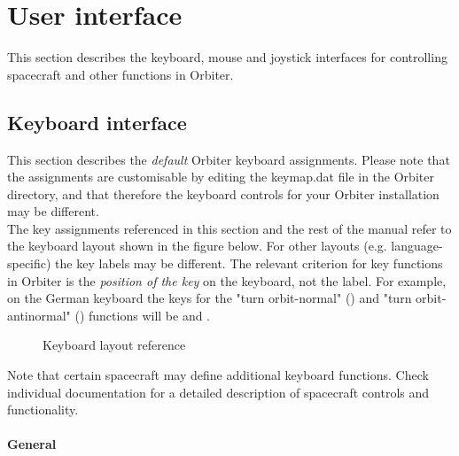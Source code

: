 \documentclass[Orbiter User Manual.tex]{subfiles}
\begin{document}
\section{User interface}
\label{sec:user_interface}
This section describes the keyboard, mouse and joystick interfaces for controlling spacecraft and other functions in Orbiter.


\subsection{Keyboard interface}
This section describes the \textit{default} Orbiter keyboard assignments. Please note that the assignments are customisable by editing the keymap.dat file in the Orbiter directory, and that therefore the keyboard controls for your Orbiter installation may be different.\\
The key assignments referenced in this section and the rest of the manual refer to the keyboard layout shown in the figure below. For other layouts (e.g. language-specific) the key labels may be different. The relevant criterion for key functions in Orbiter is the \textit{position of the key} on the keyboard, not the label. For example, on the German keyboard the keys for the "turn orbit-normal" (\keystroke{;}) and "turn orbit-antinormal" () functions will be  and .

\begin{figure}[H]
	\centering
	\caption{Keyboard layout reference}
\end{figure}

\noindent
Note that certain spacecraft may define additional keyboard functions. Check individual documentation for a detailed description of spacecraft controls and functionality.\\
\\
\textbf{General}
\end{document}
